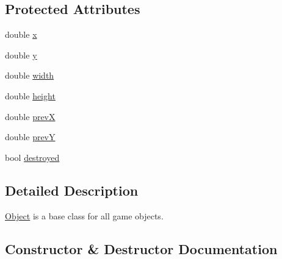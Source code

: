 \subsection*{Protected Attributes}
\begin{DoxyCompactItemize}
\item 
double \hyperlink{class_object_a02010c1708632be33a760486b1f648f8}{x}
\item 
double \hyperlink{class_object_a542c4d6094ace575fb4a28f46b9cc6a1}{y}
\item 
double \hyperlink{class_object_a3afad0ab476968e517b6f48c2a32719f}{width}
\item 
double \hyperlink{class_object_a811bf2cbf614c4f0a3935a83fb639ffd}{height}
\item 
double \hyperlink{class_object_a7fc555584143839562b90d46d294468e}{prevX}
\item 
double \hyperlink{class_object_a78d0f1c37128468d36f96bd2451b63ef}{prevY}
\item 
bool \hyperlink{class_object_a6c1d763b59ba8a5bcb23b383b3ac4428}{destroyed}
\end{DoxyCompactItemize}


\subsection{Detailed Description}
\hyperlink{class_object}{Object} is a base class for all game objects. 

\subsection{Constructor \& Destructor Documentation}
